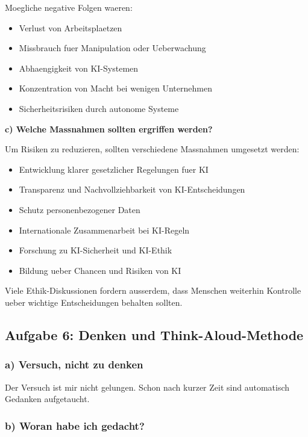 \documentclass[12pt,a4paper]{article}
\begin{document}
Moegliche negative Folgen waeren:

\begin{itemize}
    \item Verlust von Arbeitsplaetzen
    \item Missbrauch fuer Manipulation oder Ueberwachung
    \item Abhaengigkeit von KI-Systemen
    \item Konzentration von Macht bei wenigen Unternehmen
    \item Sicherheitsrisiken durch autonome Systeme
\end{itemize}

\bigskip

\textbf{c) Welche Massnahmen sollten ergriffen werden?}

Um Risiken zu reduzieren, sollten verschiedene Massnahmen umgesetzt werden:

\begin{itemize}
    \item Entwicklung klarer gesetzlicher Regelungen fuer KI
    \item Transparenz und Nachvollziehbarkeit von KI-Entscheidungen
    \item Schutz personenbezogener Daten
    \item Internationale Zusammenarbeit bei KI-Regeln
    \item Forschung zu KI-Sicherheit und KI-Ethik
    \item Bildung ueber Chancen und Risiken von KI
\end{itemize}

Viele Ethik-Diskussionen fordern ausserdem,
dass Menschen weiterhin Kontrolle ueber wichtige Entscheidungen behalten sollten.

\subsection{Aufgabe 6: Denken und Think-Aloud-Methode}

\subsubsection*{a) Versuch, nicht zu denken}

Der Versuch ist mir nicht gelungen.
Schon nach kurzer Zeit sind automatisch Gedanken aufgetaucht.

\subsubsection*{b) Woran habe ich gedacht?}
\end{document}
